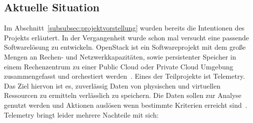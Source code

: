 \subsection{Aktuelle Situation}
Im Abschnitt~\ref{subsubsec:projektvorstellung} wurden bereits die Intentionen
des Projekts erläutert. In der Vergangenheit wurde schon mal versucht eine
passende Softwarelösung zu entwickeln. OpenStack ist ein Softwareprojekt mit
dem große Mengen an Rechen- und Netzwerkkapazitäten, sowie persistenter
Speicher in einem Rechenzentrum zu einer \gls{Public Cloud} oder \gls{Private
Cloud} Umgebung zusammengefasst und orchestiert werden~\cite{OpenStack_Intro}.
Eines der Teilprojekte ist Telemetry. Das Ziel hiervon ist es, zuverlässig
Daten von physischen und virtuellen Ressourcen zu ermitteln verlässlich zu
speichern. Die Daten sollen zur Analyse genutzt werden und Aktionen auslösen
wenn bestimmte Kriterien erreicht sind~\cite{OpenStack_Telemetry}. Telemetry
bringt leider mehrere Nachteile mit sich:


